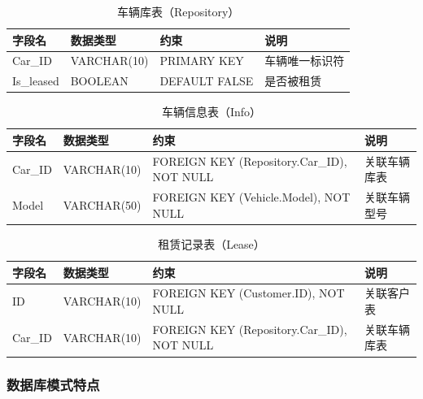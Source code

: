 \documentclass[UTF8,a4paper,12pt]{ctexart}
\begin{document}
\begin{table}[h!]
    \centering
    \caption{车辆库表（Repository）}
\begin{tabular}{|l|l|l|l|}
\hline
字段名 & 数据类型 & 约束 & 说明 \\
\hline
Car\_ID & VARCHAR(10) & PRIMARY KEY & 车辆唯一标识符 \\
\hline
Is\_leased & BOOLEAN & DEFAULT FALSE & 是否被租赁 \\
\hline
\end{tabular}
\end{table}


\begin{table}[h!]
    \centering
    \caption{车辆信息表（Info）}
\begin{tabular}{|l|l|l|l|}
\hline
字段名 & 数据类型 & 约束 & 说明 \\
\hline
Car\_ID & VARCHAR(10) & FOREIGN KEY (Repository.Car\_ID), NOT NULL & 关联车辆库表 \\
\hline
Model & VARCHAR(50) & FOREIGN KEY (Vehicle.Model), NOT NULL & 关联车辆型号 \\
\hline
\end{tabular}
\end{table}


\begin{table}[h!]
    \centering
    \caption{租赁记录表（Lease）}
\begin{tabular}{|l|l|l|l|}
\hline
字段名 & 数据类型 & 约束 & 说明 \\
\hline
ID & VARCHAR(10) & FOREIGN KEY (Customer.ID), NOT NULL & 关联客户表 \\
\hline
Car\_ID & VARCHAR(10) & FOREIGN KEY (Repository.Car\_ID), NOT NULL & 关联车辆库表 \\
\hline
\end{tabular}
\end{table}

\subsubsection{数据库模式特点}
\end{document}
